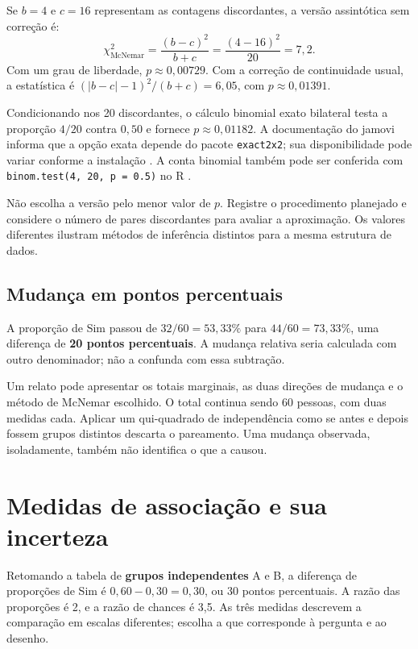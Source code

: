 Se $b=4$ e $c=16$ representam as contagens discordantes, a versão assintótica sem correção é:
\[
\chi^2_{\mathrm{McNemar}}=\frac{(b-c)^2}{b+c}
=\frac{(4-16)^2}{20}=7{,}2.
\]
Com um grau de liberdade, $p\approx0{,}00729$. Com a correção de continuidade usual, a estatística é $(|b-c|-1)^2/(b+c)=6{,}05$, com $p\approx0{,}01391$.

Condicionando nos 20 discordantes, o cálculo binomial exato bilateral testa a proporção $4/20$ contra $0{,}50$ e fornece $p\approx0{,}01182$. A documentação do jamovi informa que a opção exata depende do pacote \texttt{exact2x2}; sua disponibilidade pode variar conforme a instalação \parencite{JamoviMcNemar}. A conta binomial também pode ser conferida com \texttt{binom.test(4, 20, p = 0.5)} no R \parencite{RBinomial}.

Não escolha a versão pelo menor valor de $p$. Registre o procedimento planejado e considere o número de pares discordantes para avaliar a aproximação. Os valores diferentes ilustram métodos de inferência distintos para a mesma estrutura de dados.

\subsection{Mudança em pontos percentuais}

A proporção de Sim passou de $32/60=53{,}33\%$ para $44/60=73{,}33\%$, uma diferença de \textbf{20 pontos percentuais}. A mudança relativa seria calculada com outro denominador; não a confunda com essa subtração.

Um relato pode apresentar os totais marginais, as duas direções de mudança e o método de McNemar escolhido. O total continua sendo 60 pessoas, com duas medidas cada. Aplicar um qui-quadrado de independência como se antes e depois fossem grupos distintos descarta o pareamento. Uma mudança observada, isoladamente, também não identifica o que a causou.

\section{Medidas de associação e sua incerteza}

Retomando a tabela de \textbf{grupos independentes} A e B, a diferença de proporções de Sim é $0{,}60-0{,}30=0{,}30$, ou 30 pontos percentuais. A razão das proporções é 2, e a razão de chances é 3,5. As três medidas descrevem a comparação em escalas diferentes; escolha a que corresponde à pergunta e ao desenho.

